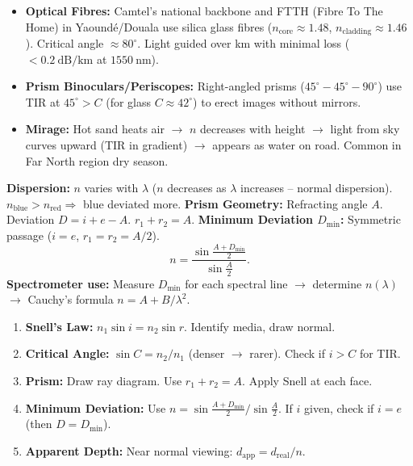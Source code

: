 \documentclass[11pt]{article}
\begin{document}
\begin{savaistu}
\begin{itemize}
\item \textbf{Optical Fibres:} Camtel's national backbone and FTTH (Fibre To The Home) in Yaoundé/Douala use silica glass fibres ($n_{\text{core}} \approx 1.48$, $n_{\text{cladding}} \approx 1.46$). Critical angle $\approx 80^\circ$. Light guided over km with minimal loss ($< 0.2\ \mathrm{dB/km}$ at $1550\ \mathrm{nm}$).
\item \textbf{Prism Binoculars/Periscopes:} Right-angled prisms ($45^\circ-45^\circ-90^\circ$) use TIR at $45^\circ > C$ (for glass $C \approx 42^\circ$) to erect images without mirrors.
\item \textbf{Mirage:} Hot sand heats air $\rightarrow$ $n$ decreases with height $\rightarrow$ light from sky curves upward (TIR in gradient) $\rightarrow$ appears as water on road. Common in Far North region dry season.
\end{itemize}
\end{savaistu}

\begin{propriete}
\textbf{Dispersion:} $n$ varies with $\lambda$ ($n$ decreases as $\lambda$ increases -- normal dispersion). $n_{\text{blue}} > n_{\text{red}} \Rightarrow$ blue deviated more.
\textbf{Prism Geometry:} Refracting angle $A$. Deviation $D = i + e - A$. $r_1 + r_2 = A$.
\textbf{Minimum Deviation $D_{\min}$:} Symmetric passage ($i = e$, $r_1 = r_2 = A/2$).
\[
n = \frac{\sin\frac{A + D_{\min}}{2}}{\sin\frac{A}{2}}.
\]
\textbf{Spectrometer use:} Measure $D_{\min}$ for each spectral line $\rightarrow$ determine $n(\lambda)$ $\rightarrow$ Cauchy's formula $n = A + B/\lambda^2$.
\end{propriete}

\begin{methode}
\begin{enumerate}
\item \textbf{Snell's Law:} $n_1\sin i = n_2\sin r$. Identify media, draw normal.
\item \textbf{Critical Angle:} $\sin C = n_2/n_1$ (denser $\to$ rarer). Check if $i > C$ for TIR.
\item \textbf{Prism:} Draw ray diagram. Use $r_1 + r_2 = A$. Apply Snell at each face.
\item \textbf{Minimum Deviation:} Use $n = \sin\frac{A+D_{\min}}{2} / \sin\frac{A}{2}$. If $i$ given, check if $i = e$ (then $D = D_{\min}$).
\item \textbf{Apparent Depth:} Near normal viewing: $d_{\text{app}} = d_{\text{real}}/n$.
\end{enumerate}
\end{methode}
\end{document}
